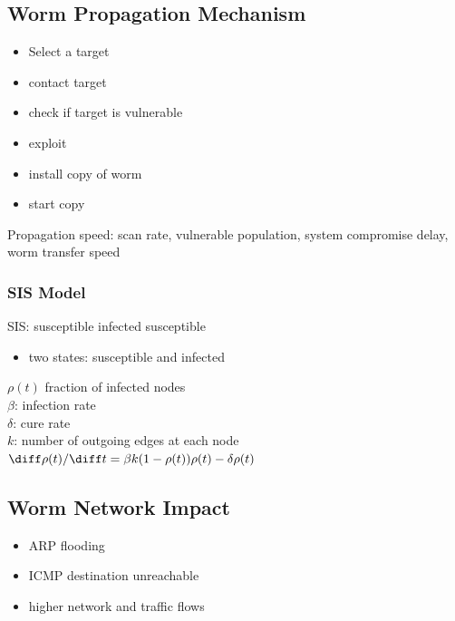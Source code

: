 \documentclass[fs, footer]{latex4ei}
\begin{document}
\begin{multicols*}{4}
      \subsection{Worm Propagation Mechanism}
      \begin{itemize}
       	\item Select a target
       	\item contact target
       	\item check if target is vulnerable
       	\item exploit
       	\item install copy of worm
       	\item start copy
       \end{itemize} 

       Propagation speed: scan rate, vulnerable population, system compromise delay, worm transfer speed


       \subsubsection{SIS Model}
       SIS: susceptible infected susceptible
       \begin{itemize}
        	\item two states: susceptible and infected
        \end{itemize} 

        $\rho (t)$ fraction of infected nodes \\
        $\beta$: infection rate \\
        $\delta$: cure rate\\
        $k$: number of outgoing edges at each node\\ 
        $\diff \rho (t) / \diff t = \beta k (1 - \rho (t)) \rho (t)  - \delta \rho (t)$\\

        \subsection{Worm Network Impact}
        \begin{itemize}
         	\item ARP flooding
         	\item ICMP destination unreachable
         	\item higher network and traffic flows
         \end{itemize} 


\end{multicols*}
\end{document}
